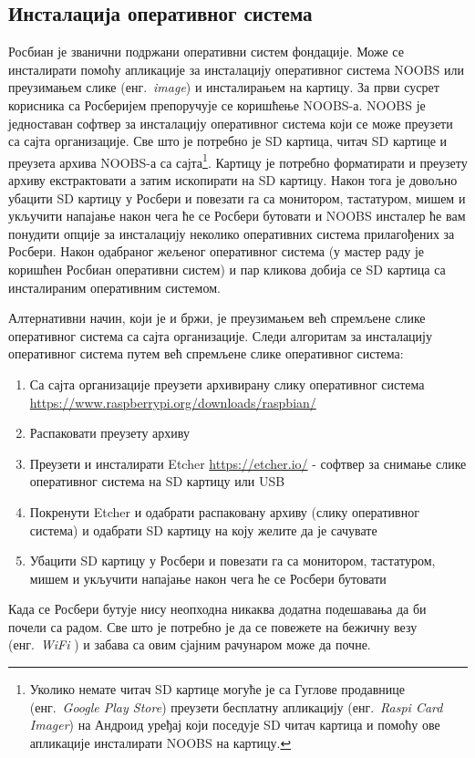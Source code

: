 \documentclass[12pt,oneside]{memoir}
\theoremstyle{remark}
\begin{document}
\subsection{Инсталација оперативног система}
Росбиан је званични подржани оперативни систем фондације. Може се инсталирати помоћу апликације за инсталацију оперативног система NOOBS или преузимањем слике (енг.~{\em image}) и инсталирањем на картицу. 
За први сусрет корисника са Росберијем препоручује се коришћење NOOBS-а. NOOBS је једноставан софтвер за инсталацију оперативног система који се може преузети са сајта организације. 
Све што је потребно је SD картица, читач SD картице и преузета архива NOOBS-а са сајта\footnote{Уколико немате читач SD картице могуће је са Гуглове продавнице (енг.~{\em Google Play Store}) преузети бесплатну апликацију  (енг.~{\em Raspi Card Imager}) на Андроид уређај који поседује SD читач картица и помоћу ове апликације инсталирати NOOBS на картицу.}. Картицу је потребно форматирати и преузету архиву екстрактовати а затим ископирати на SD картицу. Након тога је довољно убацити SD картицу у Росбери и повезати га са монитором, тастатуром, мишем и укључити напајање након чега ће се Росбери бутовати и NOOBS инсталер ће вам понудити опције за инсталацију неколико оперативних система прилагођених за Росбери. Након одабраног жељеног оперативног система (у мастер раду је коришћен Росбиан оперативни систем) и пар кликова добија се SD картица са инсталираним оперативним системом. 

Алтернативни начин, који је и бржи, је преузимањем већ спремљене слике оперативног система са сајта организације. Следи алгоритам за инсталацију оперативног система путем већ спремљене слике оперативног система:
\begin{enumerate}
\item Са сајта организације преузети архивирану слику оперативног система\newline
\url{https://www.raspberrypi.org/downloads/raspbian/} 
\item  Распаковати преузету архиву
\item Преузети и инсталирати Etcher \url{https://etcher.io/} - софтвер за снимање слике оперативног система на SD картицу или USB
\item Покренути Etcher и одабрати распаковану архиву (слику оперативног система) и одабрати SD картицу на коју желите да је сачувате
\item Убацити SD картицу у Росбери и повезати га са монитором, тастатуром, мишем и укључити напајање након чега ће се Росбери бутовати
\end{enumerate}
Када се Росбери бутује нису неопходна никаква додатна подешавања да би почели са радом. Све што је потребно је да се повежете на бежичну везу (енг.~{\em WiFi }) и забава са овим сјајним рачунаром може да почне.
\end{document}
